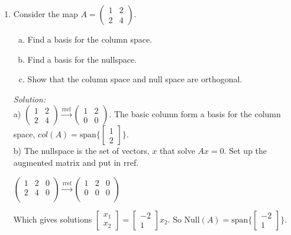 \documentclass[12pt]{article}
\newif\ifsln
\begin{document}
\begin{enumerate}[1.]
\item Consider the map $A = \begin{pmatrix}1 & 2 \\ 2 & 4\end{pmatrix}$. 
\begin{enumerate}[a)]
\item Find a basis for the column space.
\item Find a basis for the nullspace. 
\item Show that the column space and null space are orthogonal.
\end{enumerate}

\ifsln
\textit{Solution:}\\
a) $\begin{pmatrix}1 & 2 \\ 2 & 4\end{pmatrix} \overset{\text{rref}}{\to} \begin{pmatrix}1 & 2 \\ 0 & 0\end{pmatrix}$. The basic column form a basis for the column space, $col(A) = \text{span}\{\begin{bmatrix}1 \\ 2\end{bmatrix}\}$.\\

b) The nullspace is the set of vectors, $x$ that solve $Ax = 0$. Set up the augmented matrix and put in rref. 

$\left(
\begin{array}{cc|c}
1 & 2 & 0 \\
2 & 4 & 0 \\
\end{array}
\right)
\overset{\text{rref}}{\to}
\left(
\begin{array}{cc|c}
1 & 2 & 0 \\
0 & 0 & 0 \\
\end{array}
\right)
$

Which gives solutions $\begin{bmatrix}x_{1} \\ x_{2}\end{bmatrix} = \begin{bmatrix}-2 \\ 1 \end{bmatrix}x_{2}$. So $\text{Null}(A) = \text{span}\{\begin{bmatrix}-2 \\ 1 \end{bmatrix}\}$.\\


\end{enumerate}
\end{document}
